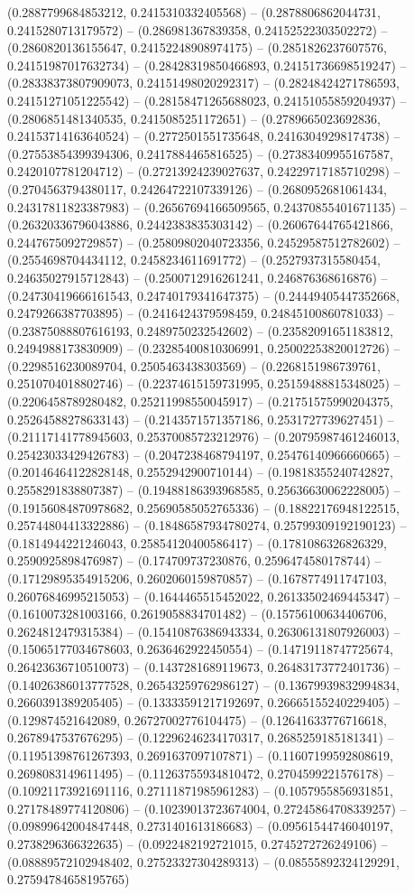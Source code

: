 (0.2887799684853212, 0.2415310332405568) -- (0.2878806862044731, 0.2415280713179572) -- (0.286981367839358, 0.24152522303502272) -- (0.2860820136155647, 0.24152248908974175) -- (0.2851826237607576, 0.24151987017632734) -- (0.28428319850466893, 0.24151736698519247) -- (0.28338373807909073, 0.24151498020292317) -- (0.28248424271786593, 0.24151271051225542) -- (0.28158471265688023, 0.24151055859204937) -- (0.2806851481340535, 0.2415085251172651) -- (0.2789665023692836, 0.24153714163640524) -- (0.2772501551735648, 0.24163049298174738) -- (0.27553854399394306, 0.2417884465816525) -- (0.27383409955167587, 0.2420107781204712) -- (0.27213924239027637, 0.24229717185710298) -- (0.2704563794380117, 0.24264722107339126) -- (0.2680952681061434, 0.24317811823387983) -- (0.26567694166509565, 0.24370855401671135) -- (0.26320336796043886, 0.2442383835303142) -- (0.26067644765421866, 0.2447675092729857) -- (0.25809802040723356, 0.24529587512782602) -- (0.2554698704434112, 0.2458234611691772) -- (0.2527937315580454, 0.24635027915712843) -- (0.2500712916261241, 0.246876368616876) -- (0.24730419666161543, 0.24740179341647375) -- (0.24449405447352668, 0.2479266387703895) -- (0.2416424379598459, 0.24845100860781033) -- (0.23875088807616193, 0.2489750232542602) -- (0.23582091651183812, 0.2494988173830909) -- (0.23285400810306991, 0.25002253820012726) -- (0.2298516230089704, 0.2505463438303569) -- (0.2268151986739761, 0.2510704018802746) -- (0.22374615159731995, 0.25159488815348025) -- (0.2206458789280482, 0.25211998550045917) -- (0.21751575990204375, 0.25264588278633143) -- (0.2143571571357186, 0.2531727739627451) -- (0.21117141778945603, 0.25370085723212976) -- (0.20795987461246013, 0.25423033429426783) -- (0.2047238468794197, 0.25476140966660665) -- (0.20146464122828148, 0.2552942900710144) -- (0.19818355240742827, 0.2558291838807387) -- (0.19488186393968585, 0.25636630062228005) -- (0.19156084870978682, 0.25690585052765336) -- (0.18822176948122515, 0.25744804413322886) -- (0.18486587934780274, 0.25799309192190123) -- (0.1814944221246043, 0.25854120400586417) -- (0.1781086326826329, 0.2590925898476987) -- (0.174709737230876, 0.2596474580178744) -- (0.17129895354915206, 0.2602060159870857) -- (0.1678774911747103, 0.26076846995215053) -- (0.1644465515452022, 0.26133502469445347) -- (0.1610073281003166, 0.2619058834701482) -- (0.15756100634406706, 0.2624812479315384) -- (0.15410876386943334, 0.26306131807926003) -- (0.15065177034678603, 0.2636462922450554) -- (0.14719118747725674, 0.26423636710510073) -- (0.1437281689119673, 0.26483173772401736) -- (0.14026386013777528, 0.26543259762986127) -- (0.13679939832994834, 0.2660391389205405) -- (0.13333591217192697, 0.26665155240229405) -- (0.129874521642089, 0.26727002776104475) -- (0.12641633776716618, 0.2678947537676295) -- (0.12296246234170317, 0.2685259185181341) -- (0.11951398761267393, 0.2691637097107871) -- (0.11607199592808619, 0.2698083149611495) -- (0.11263755934810472, 0.2704599221576178) -- (0.10921173921691116, 0.27111871985961283) -- (0.1057955856931851, 0.27178489774120806) -- (0.10239013723674004, 0.27245864708339257) -- (0.09899642004847448, 0.2731401613186683) -- (0.09561544746040197, 0.2738296366322635) -- (0.0922482192721015, 0.2745272726249106) -- (0.08889572102948402, 0.27523327304289313) -- (0.08555892324129291, 0.27594784658195765) 